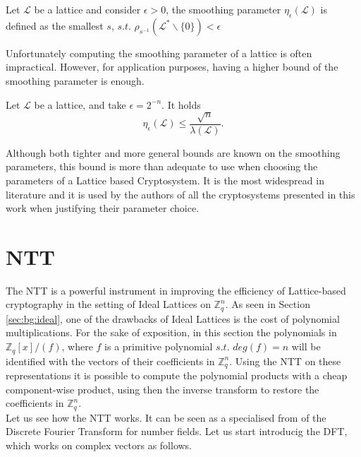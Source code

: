 \begin{definition}
Let $\mathscr{L}$ be a lattice and consider $\epsilon>0$, the smoothing parameter $\eta_\epsilon(\mathscr{L})$ is defined as the smallest $s$, $s.t.$ $\rho_{s^{-1}}(\mathscr{L}^*\backslash\{0\})<\epsilon$
\end{definition}

Unfortunately computing the smoothing parameter of a lattice is often impractical. However, for application purposes, having a higher bound of the smoothing parameter is enough.

\begin{theorem}
Let $\mathscr{L}$ be a lattice, and take $\epsilon=2^{-n}$. It holds
\begin{equation*}
\eta_\epsilon(\mathscr{L})\leq\frac{\sqrt{n}}{\lambda\left(\mathscr{L}\right)}.
\end{equation*}
\end{theorem}

Although both tighter and more general bounds are known on the smoothing parameters, this bound is more than adequate to use when choosing the parameters of a Lattice based Cryptosystem. It is the most widespread in literature and it is used by the authors of all the cryptosystems presented in this work when justifying their parameter choice.

\section{NTT}\label{sec:bg:ntt}

The NTT is a powerful instrument in improving the efficiency of Lattice-based cryptography in the setting of Ideal Lattices on $\mathbb{Z}_q^n$. As seen in Section \ref{sec:bg:ideal}, one of the drawbacks of Ideal Lattices is the cost of polynomial multiplications. For the sake of exposition, in this section the polynomials in $\mathbb{Z}_q[x]/(f)$, where $f$ is a primitive polynomial $s.t.$ $deg(f)=n$ will be identified with the vectors of their coefficients in $\mathbb{Z}_q^n$. Using the NTT on these representations it is possible to compute the polynomial products with a cheap component-wise product, using then the inverse transform to restore the coefficients in $\mathbb{Z}_q^n$.\\

Let us see how the NTT works. It can be seen as a specialised from of the Discrete Fourier Transform for number fields. Let us start introducig the DFT, which works on complex vectors as follows.

